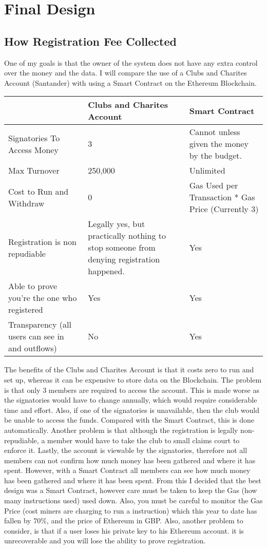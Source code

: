 \chapter{Final Design} \label{Chapter: Final Design}
\section{How Registration Fee Collected}
One of my goals is that the owner of the system does not have any extra control over the money and the data. I will compare the use of a Clubs and Charites Account (Santander) with using a Smart Contract on the Ethereum Blockchain. 
\begin{center}
 \begin{tabular}{|p{5cm}|p{5cm}|p{5cm}|}
 \hline
  & Clubs and Charites Account & Smart Contract  \\
 \hline
 Signatories To Access Money & 3 &  Cannot unless given the money by the budget. \\
 \hline
 Max Turnover & 250,000 & Unlimited \\
 \hline
 Cost to Run and Withdraw & 0 & Gas Used per Transaction * Gas Price (Currently 3) \\
 \hline
 Registration is non repudiable & Legally yes, but practically nothing to stop someone from denying registration happened.  & Yes \\
 \hline
 Able to prove you're the one who registered & Yes & Yes \\
 \hline
Transparency (all users can see in and outflows) & No & Yes \\
 \hline
\end{tabular}
\end{center}
The benefits of the Clubs and Charites Account is that it costs zero to run and set up, whereas it can be expensive to store data on the Blockchain. The problem is that only 3 members are required to access the account. This is made worse as the signatories would have to change annually, which would require considerable time and effort. Also, if one of the signatories is unavailable, then the club would be unable to access the funds. Compared with the Smart Contract, this is done automatically.  Another problem is that although the registration is legally non-repudiable, a member would have to take the club to small claims court to enforce it. Lastly, the account is viewable by the signatories, therefore not all members can not confirm how much money has been gathered and where it has spent. However, with a Smart Contract all members can see how much money has been gathered and where it has been spent.
From this I decided that the best design was a Smart Contract, however care must be taken to keep the Gas (how many instructions used) used down. Also, you must be careful to monitor the Gas Price (cost miners are charging to run a instruction) which this year to date has fallen by 70\%, and the price of Ethereum in GBP. Also, another problem to consider, is that if a user loses his private key to his Ethereum account. it is unrecoverable and you will lose the ability to prove registration.
